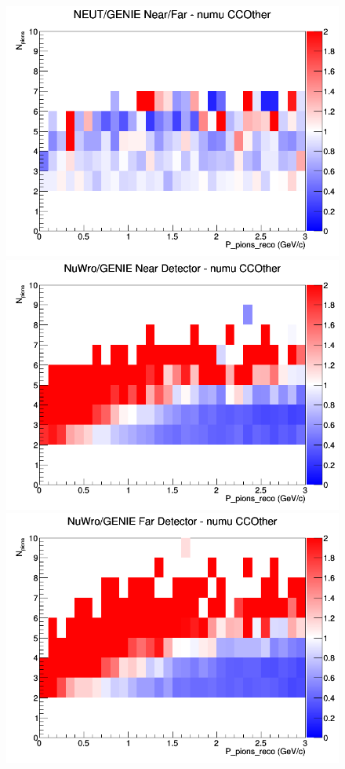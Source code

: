 \documentclass[12pt]{article}
\begin{document}
\begin{figure}[h]
\endminipage
{}
\includegraphics[width=\linewidth]{eff_N_P/FGT/pions/ratios/CCOther_NEUT_GENIE_numu_NF_N_P.png}
\endminipage
\newline
{}
\includegraphics[width=\linewidth]{eff_N_P/FGT/pions/ratios/CCOther_NuWro_GENIE_numu_near_N_P.png}
\endminipage
{}
\includegraphics[width=\linewidth]{eff_N_P/FGT/pions/ratios/CCOther_NuWro_GENIE_numu_far_N_P.png}

\end{figure}
\end{document}
